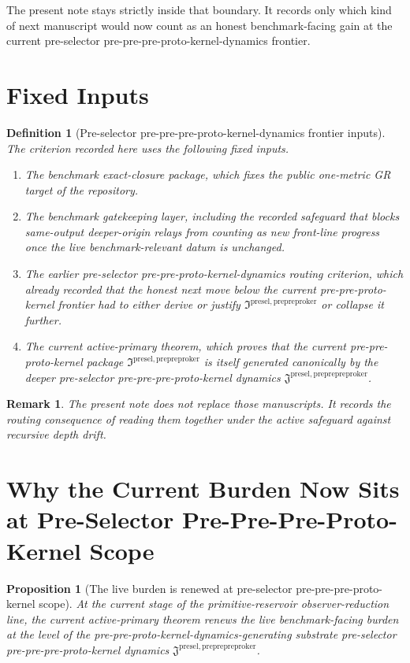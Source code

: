\documentclass[11pt]{article}
\newcommand{\PrePrePreProtoKernelPackage}{\mathfrak J^{\mathrm{presel,preprepreproker}}}
\newcommand{\PrePreProtoKernelPackage}{\mathfrak I^{\mathrm{presel,prepreproker}}}
\newtheorem{definition}{Definition}
\newtheorem{proposition}{Proposition}
\newtheorem{remark}{Remark}
\begin{document}
The present note stays strictly inside that boundary. It records only which kind of next manuscript would now count as an honest benchmark-facing gain at the current pre-selector pre-pre-pre-proto-kernel-dynamics frontier.

\section{Fixed Inputs}

\begin{definition}[Pre-selector pre-pre-pre-proto-kernel-dynamics frontier inputs]
The criterion recorded here uses the following fixed inputs.
\begin{enumerate}
    \item The benchmark exact-closure package, which fixes the public one-metric GR target of the repository.
    \item The benchmark gatekeeping layer, including the recorded safeguard that blocks same-output deeper-origin relays from counting as new front-line progress once the live benchmark-relevant datum is unchanged.
    \item The earlier pre-selector pre-pre-proto-kernel-dynamics routing criterion, which already recorded that the honest next move below the current pre-pre-proto-kernel frontier had to either derive or justify \(\PrePreProtoKernelPackage\) or collapse it further.
    \item The current active-primary theorem, which proves that the current pre-pre-proto-kernel package \(\PrePreProtoKernelPackage\) is itself generated canonically by the deeper pre-selector pre-pre-pre-proto-kernel dynamics \(\PrePrePreProtoKernelPackage\).
\end{enumerate}
\end{definition}

\begin{remark}
The present note does not replace those manuscripts. It records the routing consequence of reading them together under the active safeguard against recursive depth drift.
\end{remark}

\section{Why the Current Burden Now Sits at Pre-Selector Pre-Pre-Pre-Proto-Kernel Scope}

\begin{proposition}[The live burden is renewed at pre-selector pre-pre-pre-proto-kernel scope]
At the current stage of the primitive-reservoir observer-reduction line, the current active-primary theorem renews the live benchmark-facing burden at the level of the pre-pre-proto-kernel-dynamics-generating substrate pre-selector pre-pre-pre-proto-kernel dynamics \(\PrePrePreProtoKernelPackage\).
\end{proposition}
\end{document}
